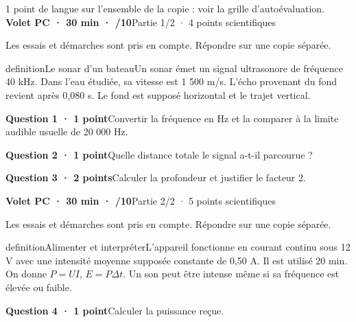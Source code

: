 \vfill{}
{\small 1 point de langue sur l’ensemble de la copie : voir la grille d’autoévaluation.}
\label{bb-6}
\noindent\textbf{Volet PC · 30 min · /10}\hfill Partie 1/2 · 4 points scientifiques
\par\vspace{2mm}Les essais et démarches sont pris en compte. Répondre sur une copie séparée.\par
\begin{pcEncadre}{definition}{Le sonar d’un bateau}Un sonar émet un signal ultrasonore de fréquence 40 kHz. Dans l’eau étudiée, sa vitesse est 1 500 m/s. L’écho provenant du fond revient après 0,080 s. Le fond est supposé horizontal et le trajet vertical.\end{pcEncadre}
\par\addvspace{3mm}\noindent\textbf{Question 1 · 1 point}\quad Convertir la fréquence en Hz et la comparer à la limite audible usuelle de 20 000 Hz.\par
\par\addvspace{3mm}\noindent\textbf{Question 2 · 1 point}\quad Quelle distance totale le signal a-t-il parcourue ?\par
\par\addvspace{3mm}\noindent\textbf{Question 3 · 2 points}\quad Calculer la profondeur et justifier le facteur 2.\par
\vfill{}
\noindent\textbf{Volet PC · 30 min · /10}\hfill Partie 2/2 · 5 points scientifiques
\par\vspace{2mm}Les essais et démarches sont pris en compte. Répondre sur une copie séparée.\par
\begin{pcEncadre}{definition}{Alimenter et interpréter}L’appareil fonctionne en courant continu sous 12 V avec une intensité moyenne supposée constante de 0,50 A. Il est utilisé 20 min. On donne $P=UI$, $E=P\Delta t$. Un son peut être intense même si sa fréquence est élevée ou faible.\end{pcEncadre}
\par\addvspace{3mm}\noindent\textbf{Question 4 · 1 point}\quad Calculer la puissance reçue.\par
